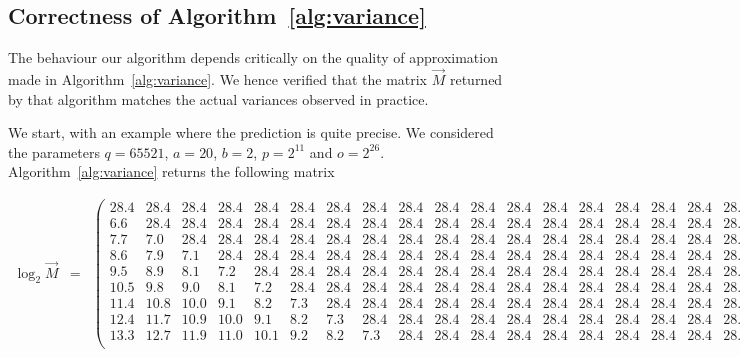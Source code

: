 \subsection{Correctness of Algorithm~\ref{alg:variance}}

The behaviour our algorithm depends critically on the quality of approximation made in Algorithm~\ref{alg:variance}. We hence verified that the matrix $\vec{M}$ returned by that algorithm matches the actual variances observed in practice.

We start, with an example where the prediction is quite precise. We considered the parameters $q=65521$, $a=20$, $b=2$, $p = 2^{11}$ and $o = 2^{26}$. Algorithm~\ref{alg:variance} returns the following matrix 

\begin{footnotesize}
\begin{eqnarray*}
\log_2 \vec{M} &=& \left(\begin{array}{cccccccccccccccccccc} 
 28.4 & 28.4 & 28.4 & 28.4 & 28.4 & 28.4 & 28.4 & 28.4 & 28.4 & 28.4 & 28.4 & 28.4 & 28.4 & 28.4 & 28.4 & 28.4 & 28.4 & 28.4 & 28.4 & 28.4\\
  6.6 & 28.4 & 28.4 & 28.4 & 28.4 & 28.4 & 28.4 & 28.4 & 28.4 & 28.4 & 28.4 & 28.4 & 28.4 & 28.4 & 28.4 & 28.4 & 28.4 & 28.4 & 28.4 & 28.4\\
  7.7 &  7.0 & 28.4 & 28.4 & 28.4 & 28.4 & 28.4 & 28.4 & 28.4 & 28.4 & 28.4 & 28.4 & 28.4 & 28.4 & 28.4 & 28.4 & 28.4 & 28.4 & 28.4 & 28.4\\
  8.6 &  7.9 &  7.1 & 28.4 & 28.4 & 28.4 & 28.4 & 28.4 & 28.4 & 28.4 & 28.4 & 28.4 & 28.4 & 28.4 & 28.4 & 28.4 & 28.4 & 28.4 & 28.4 & 28.4\\
  9.5 &  8.9 &  8.1 &  7.2 & 28.4 & 28.4 & 28.4 & 28.4 & 28.4 & 28.4 & 28.4 & 28.4 & 28.4 & 28.4 & 28.4 & 28.4 & 28.4 & 28.4 & 28.4 & 28.4\\
 10.5 &  9.8 &  9.0 &  8.1 &  7.2 & 28.4 & 28.4 & 28.4 & 28.4 & 28.4 & 28.4 & 28.4 & 28.4 & 28.4 & 28.4 & 28.4 & 28.4 & 28.4 & 28.4 & 28.4\\
 11.4 & 10.8 & 10.0 &  9.1 &  8.2 &  7.3 & 28.4 & 28.4 & 28.4 & 28.4 & 28.4 & 28.4 & 28.4 & 28.4 & 28.4 & 28.4 & 28.4 & 28.4 & 28.4 & 28.4\\
 12.4 & 11.7 & 10.9 & 10.0 &  9.1 &  8.2 &  7.3 & 28.4 & 28.4 & 28.4 & 28.4 & 28.4 & 28.4 & 28.4 & 28.4 & 28.4 & 28.4 & 28.4 & 28.4 & 28.4\\
 13.3 & 12.7 & 11.9 & 11.0 & 10.1 &  9.2 &  8.2 &  7.3 & 28.4 & 28.4 & 28.4 & 28.4 & 28.4 & 28.4 & 28.4 & 28.4 & 28.4 & 28.4 & 28.4 & 28.4\\

\end{array}
\end{eqnarray*}
\end{footnotesize}
